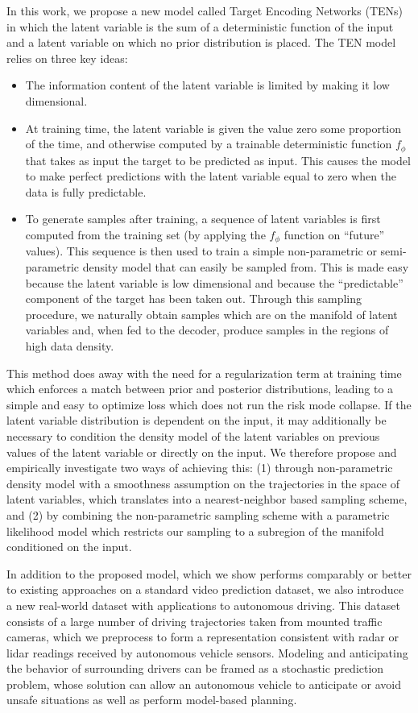 \documentclass{article}
\begin{document}
In this work, we propose a new model called Target Encoding Networks (TENs) in which the latent variable is the sum of a deterministic function of the input and a latent variable on which no prior distribution is placed.
The TEN model relies on three key ideas:
%
\begin{itemize}
  \item
    The information content of the latent variable is limited by making it low dimensional.
  \item
    At training time, the latent variable is given the value zero some proportion of the time, and otherwise computed by a trainable deterministic function $f_\phi$ that takes as input the target to be predicted as input.
  This causes the model to make perfect predictions with the latent variable equal to zero when the data is fully predictable.
  \item
    To generate samples after training, a sequence of latent variables is first computed from the training set (by applying the $f_\phi$ function on ``future'' values).
    This sequence is then used to train a simple non-parametric or semi-parametric density model that can easily be sampled from.
    This is made easy because the latent variable is low dimensional and because the ``predictable'' component of the target has been taken out.
    Through this sampling procedure, we naturally obtain samples which are on the manifold of latent variables and, when fed to the decoder, produce samples in the regions of high data density.
\end{itemize}

This method does away with the need for a regularization term at training time which enforces a match between prior and posterior distributions, leading to a simple and easy to optimize loss which does not run the risk mode collapse.
If the latent variable distribution is dependent on the input, it may additionally be necessary to condition the density model of the latent variables on previous values of the latent variable or directly on the input. We therefore propose and empirically investigate two ways of achieving this: (1) through non-parametric density model with a smoothness assumption on the trajectories in the space of latent variables, which translates into a nearest-neighbor based sampling scheme, and (2) by combining the non-parametric sampling scheme with a parametric likelihood model which restricts our sampling to a subregion of the manifold conditioned on the input.

In addition to the proposed model, which we show performs comparably or better to existing approaches on a standard video prediction dataset, we also introduce a new real-world dataset with applications to autonomous driving.
This dataset consists of a large number of driving trajectories taken from mounted traffic cameras, which we preprocess to form a representation consistent with radar or lidar readings received by autonomous vehicle sensors.
Modeling and anticipating the behavior of surrounding drivers can be framed as a stochastic prediction problem, whose solution can allow an autonomous vehicle to anticipate or avoid unsafe situations as well as perform model-based planning.
\end{document}
